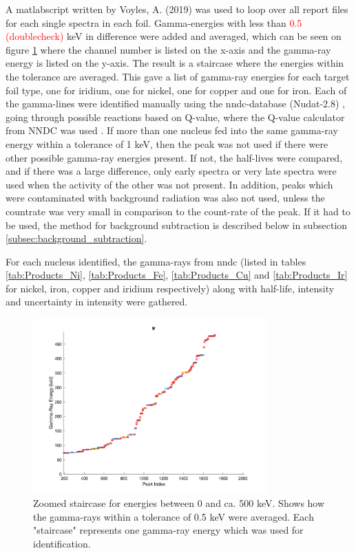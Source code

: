 A matlabscript written by Voyles, A. (2019) was used to loop over all report files for each single spectra in each foil. Gamma-energies with less than \textcolor{red}{0.5 (doublecheck)}  keV in difference were added and averaged, which can be seen on figure \ref{fig:Ir_staircase_gammas} where the channel number is listed on the x-axis and the gamma-ray energy is listed on the y-axis. The result is a staircase where the energies within the tolerance are averaged. This gave a list of gamma-ray energies for each target foil type, one for iridium, one for nickel, one for copper and one for iron. Each of the gamma-lines were identified manually using the nndc-database (Nudat-2.8) \cite{VRAPCENJAKLidijaZERKIN2015}, going through possible reactions based on Q-value, where the Q-value calculator from NNDC was used \cite{PritychenkoB.SonzogniA.NNDC}. If more than one nucleus fed into the same gamma-ray energy within a tolerance of 1 keV, then the peak was not used if there were other possible gamma-ray energies present. If not, the half-lives were compared, and if there was a large difference, only early spectra or very late spectra were used when the activity of the other was not present. In addition, peaks which were contaminated with background radiation was also not used, unless the countrate was very small in comparison to the count-rate of the peak. If it had to be used, the method for background subtraction is described below in subsection \ref{subsec:background_subtraction}. 

For each nucleus identified, the gamma-rays from nndc (listed in tables \ref{tab:Products_Ni}, \ref{tab:Products_Fe}, \ref{tab:Products_Cu} and \ref{tab:Products_Ir} for nickel, iron, copper and iridium respectively) along with half-life, intensity and uncertainty in intensity were gathered. 

\begin{figure}
    \centering
    \includegraphics[width=0.8\textwidth]{Analysis/Ir_staircase_zoomed.png}
    \caption{Zoomed staircase for energies between 0 and ca. 500 keV.  Shows how the gamma-rays within  a tolerance of 0.5 keV were averaged. Each "staircase" represents one gamma-ray energy which was used for identification. }
    \label{fig:Ir_staircase_gammas}
\end{figure}

